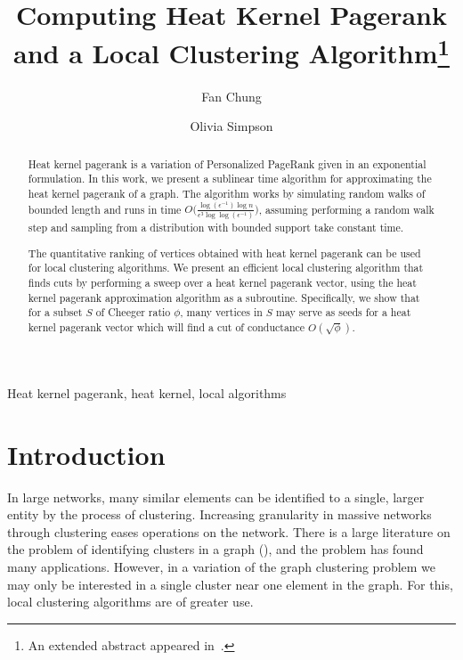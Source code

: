 \documentclass[runningheads,a4paper]{llncs}
\newcommand{\keywords}[1]{\par\addvspace\baselineskip
\noindent\keywordname\enspace\ignorespaces#1}
\newcommand{\hkprcomplexity}{O\big(\frac{\log(\epsilon^{-1})\log n}{\epsilon^3\log\log(\epsilon^{-1})}\big)}
\begin{document}
\mainmatter

\title{Computing Heat Kernel Pagerank and a Local Clustering
Algorithm\footnote{An extended abstract appeared in~\cite{chung2014computing}.}}

\author{Fan Chung
\and Olivia Simpson}


\maketitle

\begin{abstract}
Heat kernel pagerank is a variation of Personalized PageRank given in an
exponential formulation.  In this work, we present a sublinear time algorithm
for approximating the heat kernel pagerank of a graph.  The algorithm works by
simulating random walks of bounded length and runs in time $\hkprcomplexity$,
assuming performing a random walk step and sampling from a distribution with
bounded support take constant time.

The quantitative ranking of vertices obtained with heat kernel pagerank can be
used for local clustering algorithms.  We present an efficient local clustering
algorithm that finds cuts by performing a sweep over a heat kernel pagerank
vector, using the heat kernel pagerank approximation algorithm as a subroutine.
Specifically, we show that for a subset $S$ of Cheeger ratio $\phi$, many
vertices in $S$ may serve as seeds for a heat kernel pagerank vector which will
find a cut of conductance $O(\sqrt{\phi})$.
\end{abstract}
\keywords{Heat kernel pagerank, heat kernel, local algorithms}

\section{Introduction}
\label{sec:introduction}
In large networks, many similar elements can be identified to a single, larger
entity by the process of clustering.  Increasing granularity in massive networks
through clustering eases operations on the network.  There is a large literature
on the problem of identifying clusters in a graph
(\cite{csz:spectralkway:94,shi2000normalized,njw:spectralcluster:02,kvv:clusterings:04,lc:powercluster:10,lc:textcluster:10}),
and the problem has found many applications.  However, in a variation of the
graph clustering problem we may only be interested in a single cluster near one
element in the graph.  For this, local clustering algorithms are of greater use.
\end{document}
